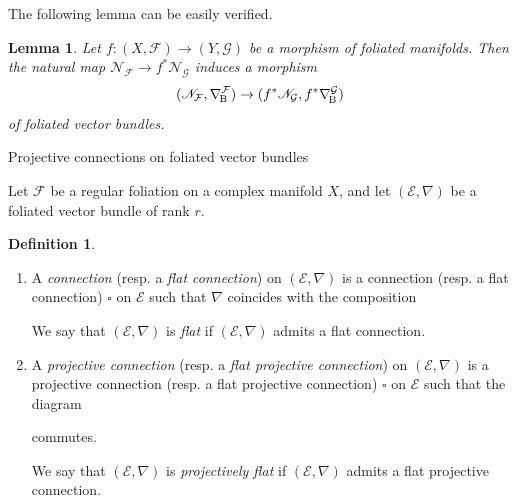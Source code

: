 \documentclass[english,10pt]{amsart}
\makeatletter
\renewcommand\subsection{\@startsection{subsection}{2}%
  \z@{.5\linespacing\@plus.7\linespacing}{-.5em}%
  {\normalfont\sffamily}}
\newcommand{\nablaBott}{\nabla_{\! \textup{B}}}
\newcommand{\cF}{\mathcal{F}}
\newcommand{\cG}{\mathcal{G}}
\newcommand{\sD}{\mathscr{D}}
\newcommand{\sE}{\mathscr{E}}
\newcommand{\sN}{\mathscr{N}}
\newcommand{\sO}{\mathscr{O}}
\newtheorem{lemma}[thm]{Lemma}
\theoremstyle{definition}
\newtheorem{defn}[thm]{Definition}
\theoremstyle{remark}
\numberwithin{equation}{section}
\makeatother
\begin{document}
\medskip

The following lemma can be easily verified.

\begin{lemma}\label{lemma:functoriality_Bott_connection}
Let $f \colon (X,\cF) \to (Y,\cG)$ be a morphism of foliated manifolds. Then the natural map $\sN_\cF \to f^*\sN_\cG$ induces a morphism 
\[
(\sN_\cF,\nablaBott^\cF) \to (f^*\sN_\cG,f^*\nablaBott^\cG)
\]
of foliated vector bundles.
\end{lemma}

\subsection{Projective connections on foliated vector bundles}

Let $\cF$ be a regular foliation on a complex manifold $X$, and let $(\sE,\nabla)$ be a foliated vector bundle of rank $r$. 

\begin{defn}
$\, $
\begin{enumerate}
\item A \emph{connection} (resp. a \emph{flat connection}) on $(\sE,\nabla)$ is a connection (resp. a flat connection) $\square$ on $\sE$ such that $\nabla$ coincides with the composition 
\begin{center}
\end{center}

We say that $(\sE,\nabla)$ is \emph{flat} if $(\sE,\nabla)$ admits a flat connection.

\item A \emph{projective connection} (resp. a \emph{flat projective connection}) on $(\sE,\nabla)$ is a projective connection (resp. a flat projective connection) $\square$ on $\sE$ such that the diagram  
\begin{center}
\end{center}
commutes. 

We say that $(\sE,\nabla)$ is \emph{projectively flat} if $(\sE,\nabla)$ admits a flat projective connection. 
\end{enumerate}
\end{defn}
\end{document}
